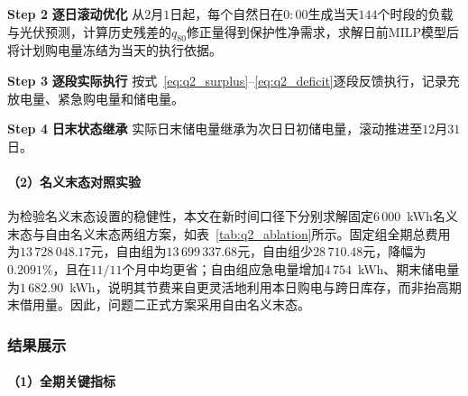 \documentclass[12pt,a4paper]{ctexart}
\theoremstyle{definition}
\theoremstyle{plain}
\theoremstyle{remark}
\newcommand{\step}[1]{\par\noindent\textbf{Step #1}\quad}
\begin{document}
\step{2} \textbf{逐日滚动优化} 从$2$月$1$日起，每个自然日在$0{:}00$生成当天$144$个时段的负载与光伏预测，计算历史残差的$q_{80}$修正量得到保护性净需求，求解日前MILP模型后将计划购电量冻结为当天的执行依据。

\step{3} \textbf{逐段实际执行} 按式~\eqref{eq:q2_surplus}--\eqref{eq:q2_deficit}逐段反馈执行，记录充放电量、紧急购电量和储电量。

\step{4} \textbf{日末状态继承} 实际日末储电量继承为次日日初储电量，滚动推进至$12$月$31$日。

\paragraph{（2）名义末态对照实验}

为检验名义末态设置的稳健性，本文在新时间口径下分别求解固定$6\,000$~kWh名义末态与自由名义末态两组方案，如表~\ref{tab:q2_ablation}所示。固定组全期总费用为$13\,728\,048.17$元，自由组为$13\,699\,337.68$元，自由组少$28\,710.48$元，降幅为$0.2091\%$，且在$11/11$个月中均更省；自由组应急电量增加$4\,754$~kWh、期末储电量为$1\,682.90$~kWh，说明其节费来自更灵活地利用本日购电与跨日库存，而非抬高期末借用量。因此，问题二正式方案采用自由名义末态。

\begin{table}[H]
\centering
\caption{问题二名义末态对照：$2$--$12$月总费用对比}
\label{tab:q2_ablation}
\end{table}

\subsubsection{结果展示}

\paragraph{（1）全期关键指标}
\end{document}
